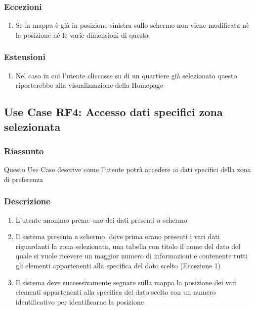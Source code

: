         \subsubsection{Eccezioni}
            \begin{enumerate}
                \item Se la mappa è già in posizione sinistra sullo schermo non viene modificata nè la posizione nè le varie dimensioni di questa
            \end{enumerate}
        \subsubsection{Estensioni}
            \begin{enumerate}
                \item Nel caso in cui l'utente cliccasse su di un quartiere già selezionato questo riporterebbe alla visualizzazione della Homepage
            \end{enumerate}

    \subsection{Use Case RF4: Accesso dati specifici zona selezionata}
        \subsubsection{Riassunto}
            Questo Use Case descrive come l'utente potrà accedere ai dati specifici della zona di preferenza
        \subsubsection{Descrizione}
            \begin{enumerate}
                \item L'utente anonimo preme uno dei dati presenti a schermo
                \item Il sistema presenta a schermo, dove prima erano presenti i vari dati riguardanti la zona selezionata, una tabella con titolo il nome del dato del quale si vuole ricevere un maggior numero di informazioni e contenente tutti gli elementi appartenenti alla specifica del dato scelto (Eccezione 1)
                \item Il sistema deve successivamente segnare sulla mappa la posizione dei vari elementi appartenenti alla specifica del dato scelto con un numero identificativo per identificarne la posizione
            \end{enumerate}
